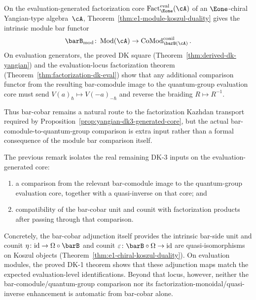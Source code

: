 \begin{remark}
\label{rem:bar-cobar-kazhdan-candidate}
On the evaluation-generated factorization core
$\operatorname{Fact}_{\Eone}^{\mathrm{eval}}(\cA)$ of an $\Eone$-chiral Yangian-type algebra~$\cA$,
Theorem~\ref{thm:e1-module-koszul-duality} gives the intrinsic module
bar functor
\[
\barB_{\mathrm{mod}}\colon
\operatorname{Mod}(\cA)
\to
\operatorname{CoMod}^{\mathrm{conil}}_{\barB(\cA)}.
\]
On evaluation generators, the proved DK square
\textup{(}Theorem~\ref{thm:derived-dk-yangian}\textup{)} and the
evaluation-locus factorization theorem
\textup{(}Theorem~\ref{thm:factorization-dk-eval}\textup{)} show that
any additional comparison functor from the resulting bar-comodule image
to the quantum-group evaluation core must send
$V(a)_\hbar \mapsto V(-a)_{-\hbar}$ and reverse the braiding
$R \mapsto R^{-1}$.

Thus bar-cobar remains a natural route to the factorization Kazhdan
transport required by
Proposition~\ref{prop:yangian-dk3-generated-core}, but the actual
bar-comodule-to-quantum-group comparison is extra input rather than a
formal consequence of the module bar comparison itself.
\end{remark}

\begin{remark}
\label{rem:dk3-remaining-after-barcobar}
The previous remark isolates the real remaining DK-3 inputs on the
evaluation-generated core:
\begin{enumerate}[label=\textup{(\roman*)}]
\item a comparison from the relevant bar-comodule image to the
 quantum-group evaluation core, together with a quasi-inverse on that
 core; and
\item compatibility of the bar-cobar unit and counit with
 factorization products after passing through that comparison.
\end{enumerate}

Concretely, the bar-cobar adjunction itself provides the intrinsic
bar-side unit and counit
$\eta\colon \mathrm{id} \to \Omega \circ \barB$ and counit
$\varepsilon\colon \barB \circ \Omega \to \mathrm{id}$ are
quasi-isomorphisms on Koszul objects
\textup{(}Theorem~\textup{\ref{thm:e1-chiral-koszul-duality})}.
On evaluation modules, the proved DK-1 theorem shows that these
adjunction maps match the expected evaluation-level identifications.
Beyond that locus, however, neither the bar-comodule/quantum-group
comparison nor its factorization-monoidal/quasi-inverse enhancement is
automatic from bar-cobar alone.
\end{remark}

